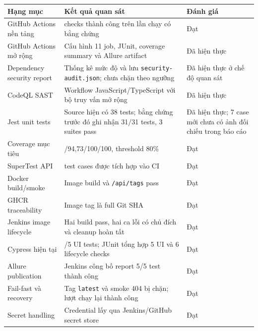 \documentclass[
  vietnamese,
  12pt,
  a4paper,
  oneside]{report}
\begin{document}
\begin{longtable}[]{@{}
  >{\raggedright\arraybackslash}p{}
  >{\raggedright\arraybackslash}p{}
  >{\raggedright\arraybackslash}p{}@{}}
\toprule\noalign{}
\begin{minipage}[b]{\linewidth}\raggedright
Hạng mục
\end{minipage} & \begin{minipage}[b]{\linewidth}\raggedright
Kết quả quan sát
\end{minipage} & \begin{minipage}[b]{\linewidth}\raggedright
Đánh giá
\end{minipage} \\
\midrule\noalign{}
\endhead
\bottomrule\noalign{}
\endlastfoot
GitHub Actions nền tảng & 10 checks thành công trên lần chạy có bằng
chứng & Đạt \\
GitHub Actions mở rộng & Cấu hình 11 job, JUnit, coverage summary và
Allure artifact & Đã hiện thực \\
Dependency security report & Thống kê mức độ và lưu
\texttt{security-audit.json}; chưa chặn theo ngưỡng & Đã hiện thực ở chế
độ quan sát \\
CodeQL SAST & Workflow JavaScript/TypeScript với bộ truy vấn mở rộng &
Đã hiện thực \\
Jest unit tests & Source hiện có 38 tests; bằng chứng trước đó ghi nhận
31/31 tests, 3 suites pass & Đã hiện thực; 7 case mới chưa có ảnh đối
chiếu trong báo cáo \\
Coverage mục tiêu & 100/94,73/100/100, threshold 80\% & Đạt \\
SuperTest API & 15 test cases được tích hợp vào CI & Đạt \\
Docker build/smoke & Image build và \texttt{/api/tags} pass & Đạt \\
GHCR traceability & Image tag là full Git SHA & Đạt \\
Jenkins image lifecycle & Hai build pass, hai ca lỗi có chủ đích và
cleanup hoàn tất & Đạt \\
Cypress hiện tại & 5/5 UI tests; JUnit tổng hợp 5 UI và 6 lifecycle
checks & Đạt \\
Allure publication & Jenkins công bố report 5/5 test thành công & Đạt \\
Fail-fast và recovery & Tag \texttt{latest} và smoke 404 bị chặn; lượt
chạy lại thành công & Đạt \\
Secret handling & Credential lấy qua Jenkins/GitHub secret store &
Đạt \\
\end{longtable}
\end{document}
